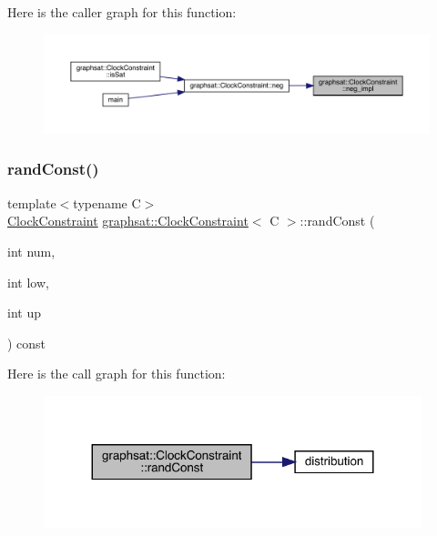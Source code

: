 Here is the caller graph for this function\+:
\nopagebreak
\begin{figure}[H]
\begin{center}
\leavevmode
\includegraphics[width=350pt]{classgraphsat_1_1_clock_constraint_a5217585f904187d8cf0880e6dd1838b0_icgraph}
\end{center}
\end{figure}
\mbox{\label{classgraphsat_1_1_clock_constraint_a25326d99afbcc8355cfbc290ba81af8b}} 
\subsubsection{\texorpdfstring{randConst()}{randConst()}}
{\footnotesize\ttfamily template$<$typename C$>$ \\
\mbox{\hyperlink{classgraphsat_1_1_clock_constraint}{Clock\+Constraint}} \mbox{\hyperlink{classgraphsat_1_1_clock_constraint}{graphsat\+::\+Clock\+Constraint}}$<$ C $>$\+::rand\+Const (\begin{DoxyParamCaption}\item[{int}]{num,  }\item[{int}]{low,  }\item[{int}]{up }\end{DoxyParamCaption}) const\hspace{0.3cm}{\ttfamily [inline]}}

Here is the call graph for this function\+:
\nopagebreak
\begin{figure}[H]
\begin{center}
\leavevmode
\includegraphics[width=311pt]{classgraphsat_1_1_clock_constraint_a25326d99afbcc8355cfbc290ba81af8b_cgraph}
\end{center}
\end{figure}


